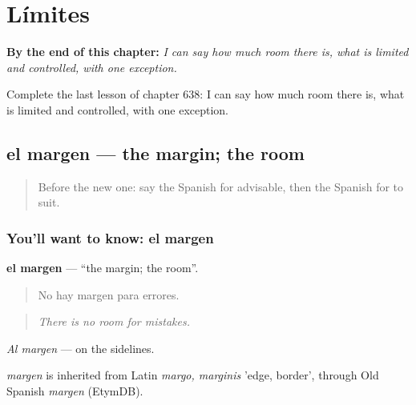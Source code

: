 
\chapter{Límites}
\label{ch:es-limites}

\begin{chapteropening}
\textbf{By the end of this chapter:} \emph{I can say how much room there is, what is limited and controlled, with one exception.}

Complete the last lesson of chapter 638: I can say how much room there is, what is limited and controlled, with one exception.
\end{chapteropening}

\section[el margen]{el margen — the margin; the room}

\label{lesson:ES-C638-margen}



\begin{quote}
Before the new one: say the Spanish for advisable, then the Spanish for to suit.
\end{quote}

\subsection*{You'll want to know: el margen}
\textbf{el margen} — \textquotedblleft{}the margin; the room\textquotedblright{}.

\begin{quote}
No hay margen para errores.
\end{quote}

\begin{quote}
\emph{There is no room for mistakes.}
\end{quote}

\emph{Al margen} — on the sidelines.

\begin{cousinweb}
\emph{margen} is inherited from Latin \emph{margo, marginis} 'edge, border', through Old Spanish \emph{margen} (EtymDB).
\end{cousinweb}

